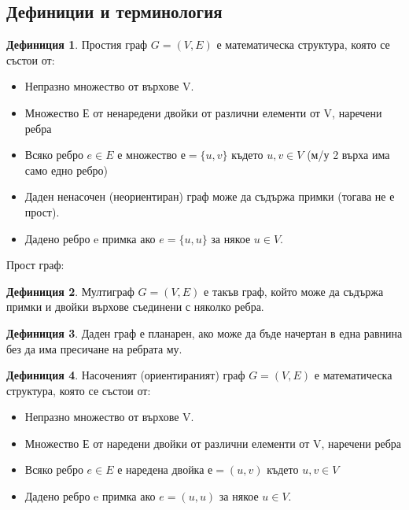 \documentclass[fleqn, 12pt]{article}
\theoremstyle{definition}
\newtheorem{definition}{Дефиниция}[subsection]
\begin{document}
\subsection{Дефиниции и терминология}

\begin{definition}
Простия	 граф $G = (V,E)$ е математическа структура, която се състои от:
\begin{itemize}
\item Непразно множество от върхове V.
\item Множество Е от ненаредени двойки от различни елементи от V, наречени ребра
\item Всяко ребро $e \in E$ е множество $е = \{ u,v \}$ където $u,v \in V$ (м/у 2 върха има само едно ребро)
\item Даден ненасочен (неориентиран) граф може да съдържа примки (тогава не е прост).
\item Дадено ребро e примка ако $e = \{u, u\}$ за някое $u \in V$.
\end{itemize}
Прост граф:\\
\end{definition}

\begin{definition}
Мултиграф $G = (V, E)$ е такъв граф, който може да съдържа примки и двойки върхове съединени с няколко ребра.
\end{definition}

\begin{definition}
Даден граф е планарен, ако може да бъде начертан в една равнина без да има пресичане на ребрата му.
\end{definition}

\begin{definition}
Насоченият (ориентираният) граф $G = (V, E)$ е математическа структура, която се състои от:
\begin{itemize}
\item Непразно множество от върхове V.
\item Множество Е от наредени двойки от различни елементи от V, наречени ребра
\item Всяко ребро $e \in E$ е наредена двойка $е = ( u, v )$ където $u,v \in V$
\item Дадено ребро e примка ако $e = ( u, u )$ за някое $u \in V$.
\end{itemize}
\end{definition}
\end{document}
